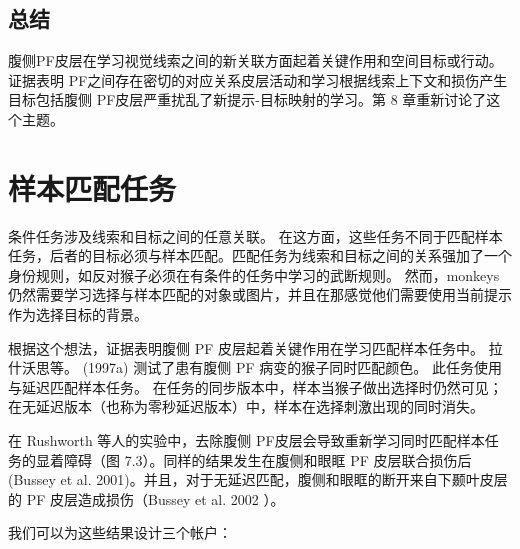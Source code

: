\subsection{总结}
腹侧PF皮层在学习视觉线索之间的新关联方面起着关键作用和空间目标或行动。证据表明 PF之间存在密切的对应关系皮层活动和学习根据线索上下文和损伤产生目标包括腹侧 PF皮层严重扰乱了新提示-目标映射的学习。第 8 章重新讨论了这个主题。
\section{样本匹配任务}
\par
条件任务涉及线索和目标之间的任意关联。 在这方面，这些任务不同于匹配样本任务，后者的目标必须与样本匹配。匹配任务为线索和目标之间的关系强加了一个身份规则，如反对猴子必须在有条件的任务中学习的武断规则。 然而，monkeys 仍然需要学习选择与样本匹配的对象或图片，并且在那感觉他们需要使用当前提示作为选择目标的背景。
\par
 根据这个想法，证据表明腹侧 PF 皮层起着关键作用在学习匹配样本任务中。 拉什沃思等。 (1997a) 测试了患有腹侧 PF 病变的猴子同时匹配颜色。 此任务使用与延迟匹配样本任务。 在任务的同步版本中，样本当猴子做出选择时仍然可见；在无延迟版本（也称为零秒延迟版本）中，样本在选择刺激出现的同时消失。
\par
在 Rushworth 等人的实验中，去除腹侧 PF皮层会导致重新学习同时匹配样本任务的显着障碍（图 7.3）。同样的结果发生在腹侧和眼眶 PF 皮层联合损伤后(Bussey et al. 2001)。并且，对于无延迟匹配，腹侧和眼眶的断开来自下颞叶皮层的 PF 皮层造成损伤（Bussey et al. 2002 ）。
\par
我们可以为这些结果设计三个帐户：
